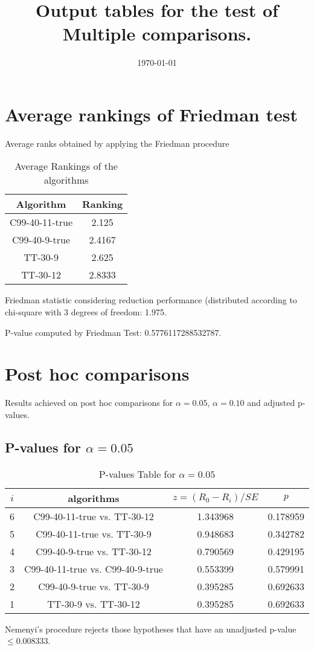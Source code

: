 \documentclass[a4paper,10pt]{article}
\title{Output tables for the test of Multiple comparisons.}
\author{}
\date{\today}
\begin{document}
\begin{landscape}
\pagestyle{empty}
\maketitle
\thispagestyle{empty}
\section{Average rankings of Friedman test}



Average ranks obtained by applying the Friedman procedure

\begin{table}[!htp]
\centering
\begin{tabular}{|c|c|}\hline
Algorithm&Ranking\\\hline
C99-40-11-true & 2.125\\
C99-40-9-true & 2.4167\\
TT-30-9 & 2.625\\
TT-30-12 & 2.8333\\
\hline
\end{tabular}
\caption{Average Rankings of the algorithms}
\end{table}

Friedman statistic considering reduction performance (distributed according to chi-square with 3 degrees of freedom: 1.975.

P-value computed by Friedman Test: 0.5776117288532787.\newline



\pagebreak

\section{Post hoc comparisons}

Results achieved on post hoc comparisons for $\alpha = 0.05$, $\alpha = 0.10$ and adjusted p-values.

\subsection{P-values for $\alpha=0.05$}

\begin{table}[!htp]
\centering\scriptsize
\begin{tabular}{cccc}
$i$&algorithms&$z=(R_0 - R_i)/SE$&$p$\\
\hline6&C99-40-11-true vs. TT-30-12&1.343968&0.178959\\
5&C99-40-11-true vs. TT-30-9&0.948683&0.342782\\
4&C99-40-9-true vs. TT-30-12&0.790569&0.429195\\
3&C99-40-11-true vs. C99-40-9-true&0.553399&0.579991\\
2&C99-40-9-true vs. TT-30-9&0.395285&0.692633\\
1&TT-30-9 vs. TT-30-12&0.395285&0.692633\\
\hline
\end{tabular}
\caption{P-values Table for $\alpha=0.05$}
\end{table}Nemenyi's procedure rejects those hypotheses that have an unadjusted p-value $\le0.008333$.


\end{landscape}
\end{document}
